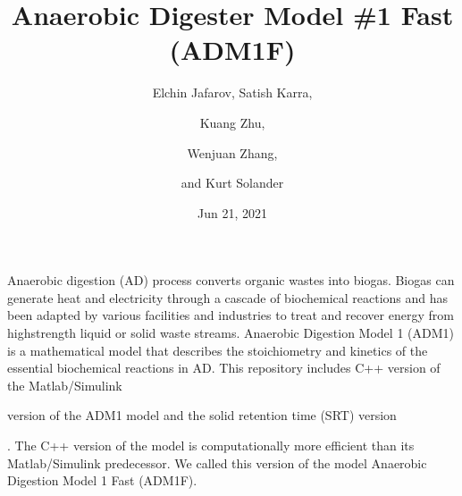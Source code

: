 \documentclass[a4paper,10pt,english]{sphinxmanual}
\title{Anaerobic Digester Model \#1 Fast (ADM1F)}
\date{Jun 21, 2021}
\author{Elchin Jafarov, Satish Karra,\and Kuang Zhu,\and Wenjuan Zhang,\and and Kurt Solander}
\let\sphinxpxdimen\pdfpxdimen\else\newdimen\sphinxpxdimen
\begin{document}
\pagestyle{empty}
\sphinxmaketitle
\pagestyle{plain}
\sphinxtableofcontents
\pagestyle{normal}
\label{\detokenize{index::doc}}


\sphinxAtStartPar
Anaerobic digestion (AD) process converts organic wastes into biogas. Biogas can generate heat and electricity through a cascade of biochemical reactions and has been adapted by various facilities and industries to treat and recover energy from high\sphinxhyphen{}strength liquid or solid waste streams. Anaerobic Digestion Model 1 (ADM1) is a mathematical model that describes the stoichiometry and kinetics of the essential biochemical reactions in AD. This repository includes C++ version of the Matlab/Simulink %
\begin{footnote}[1]\sphinxAtStartFootnote
{}
%
\end{footnote} version of the ADM1 model and the solid retention time (SRT) version %
\begin{footnote}[2]\sphinxAtStartFootnote
{}
%
\end{footnote}. The C++ version of the model is computationally more efficient than its Matlab/Simulink predecessor. We called this version of the model Anaerobic Digestion Model 1 Fast (ADM1F).

\noindent\sphinxincludegraphics[width=1216\sphinxpxdimen,height=685\sphinxpxdimen]{{digester_m}.png}
\end{document}
